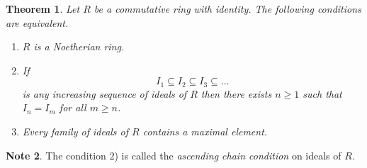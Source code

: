 \documentclass[12pt, letterpaper, oneside]{article}
\theoremstyle{plain}
\newtheorem{theorem}{Theorem}[section]
\theoremstyle{definition}
\newtheorem{note}[theorem]{Note}
\newcommand{\benu}{\begin{enumerate}}
\newcommand{\eenu}{\end{enumerate}}
\newcommand{\vs}{\vskip 5mm}
\begin{document}
\vs\vs

\begin{theorem}
\label{THM_NOETHRINGEQCON}
Let $R$ be a commutative ring with identity. The following conditions are equivalent. 

\vskip -13mm

\benu
\item $R$ is a Noetherian ring.
\item If 
$$I_{1}\subseteq I_{2}\subseteq I_{3} \subseteq \dots$$
is any increasing sequence of ideals of $R$ then there exists $n\geq 1$ such
that $I_{n} = I_{m}$ for all $m\geq n$.  
\item Every family of ideals of $R$ contains a maximal element. 
\eenu
\end{theorem}


\vs\vs

\begin{note}
The condition 2) is called the \emph{ascending chain condition} on ideals of $R$. 
\end{note}

\vs\vs
\end{document}
